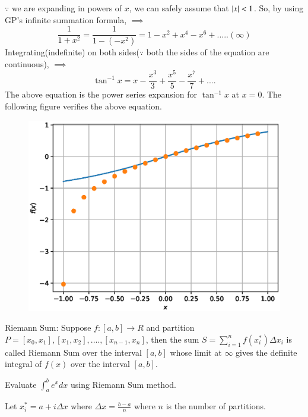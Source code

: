 \documentclass[journal,12pt,twocolumn]{IEEEtran}
\begin{document}
$\because$ we are expanding in powers of $x$, we can safely assume that $\left\vert x\right\vert < 1$. So, by using GP's infinite summation formula,
$\implies$ 
\begin{equation}
\frac{1}{1+x^2}=\frac{1}{1-(-x^2)}=1-x^2+x^4-x^6+.....(\infty)
\end{equation}
Integrating(indefinite) on both sides($\because$ both the sides of the equation are continuous),
$\implies$
\begin{equation}
\tan^{-1} x= x-\frac{x^3}{3}+\frac{x^5}{5}-\frac{x^7}{7}+....
\end{equation}
The above equation is the power series expansion for $\tan^{-1} x$ at $x=0$. The following figure verifies the above equation.

\begin{figure}[!ht]
\begin{center}
\includegraphics[width=\columnwidth]{./figs/7.eps}
\end{center}
\label{fig:4}	
\end{figure}
\begin{definition}
Riemann Sum:
Suppose $f:[a,b] \to R$ and partition $P={[x_0,x_1],[x_1,x_2],....,[x_{n-1},x_n]}$, then the sum $S=\sum_{i=1}^{n}f(x^*_i)\Delta x_i$ is called Riemann Sum over the interval $[a,b]$ whose limit at $\infty$ gives the definite integral of $f(x)$ over the interval $[a,b]$. 
\end{definition}
\begin{problem}
Evaluate $\int_{a}^{b} e^{x} dx$ using Riemann Sum method.
\end{problem}
\solution
Let $x^*_i=a+i\Delta x$ where $\Delta x=\frac{b-a}{n}$ where $n$ is the number of partitions.
\end{document}
